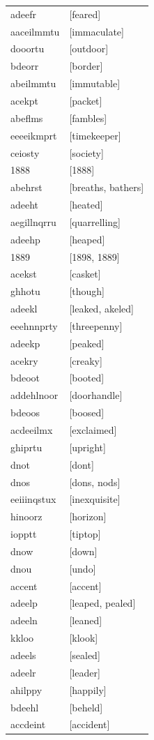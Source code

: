 \documentclass{article}
\begin{document}
\begin{tabular}{ll}
adeefr & [feared] \\
aaceilmmtu & [immaculate] \\
dooortu & [outdoor] \\
bdeorr & [border] \\
abeilmmtu & [immutable] \\
acekpt & [packet] \\
abeflms & [fambles] \\
eeeeikmprt & [timekeeper] \\
ceiosty & [society] \\
1888 & [1888] \\
abehrst & [breaths, bathers] \\
adeeht & [heated] \\
aegillnqrru & [quarrelling] \\
adeehp & [heaped] \\
1889 & [1898, 1889] \\
acekst & [casket] \\
ghhotu & [though] \\
adeekl & [leaked, akeled] \\
eeehnnprty & [threepenny] \\
adeekp & [peaked] \\
acekry & [creaky] \\
bdeoot & [booted] \\
addehlnoor & [doorhandle] \\
bdeoos & [boosed] \\
acdeeilmx & [exclaimed] \\
ghiprtu & [upright] \\
dnot & [dont] \\
dnos & [dons, nods] \\
eeiiinqstux & [inexquisite] \\
hinoorz & [horizon] \\
iopptt & [tiptop] \\
dnow & [down] \\
dnou & [undo] \\
accent & [accent] \\
adeelp & [leaped, pealed] \\
adeeln & [leaned] \\
kkloo & [klook] \\
adeels & [sealed] \\
adeelr & [leader] \\
ahilppy & [happily] \\
bdeehl & [beheld] \\
accdeint & [accident] \\

\end{tabular}
\end{document}
